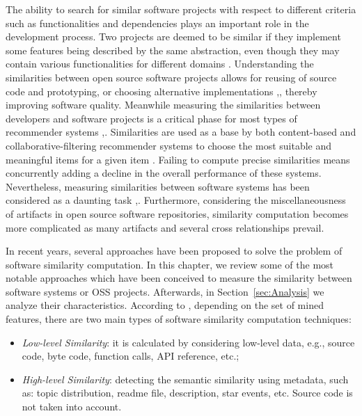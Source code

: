 The ability to search for similar software projects with respect to different criteria such as functionalities and dependencies plays an important role in the development process. Two projects are deemed to be similar if they implement some features being described by the same abstraction, even though they may contain various functionalities for different domains \cite{McMillan:2012:DSS:2337223.2337267}. Understanding the similarities between open source software projects allows for reusing of source code and prototyping, or choosing alternative implementations \cite{Schafer:2007:CFR:1768197.1768208},\cite{10.1109/SANER.2017.7884605}, thereby improving software quality. Meanwhile measuring the similarities between developers and software projects is a critical phase for most types of recommender systems \cite{DBLP:conf/rweb/NoiaO15},\cite{Sarwar:2001:ICF:371920.372071}. Similarities are used as a base by both content-based and collaborative-filtering recommender systems to choose the most suitable and meaningful items for a given item \cite{Schafer:2007:CFR:1768197.1768208}. Failing to compute precise similarities means concurrently adding a decline in the overall performance of these systems. Nevertheless, measuring similarities between software systems has been considered as a daunting task \cite{Chen:2015:SFD:2684822.2685305},\cite{McMillan:2012:DSS:2337223.2337267}. Furthermore, considering the miscellaneousness of artifacts in open source software repositories, similarity computation becomes more complicated as many artifacts and several cross relationships prevail. 

In recent years, several approaches have been proposed to solve the problem of software similarity computation. In this chapter, we review some of the most notable approaches which have been conceived to measure the similarity between software systems or OSS projects. Afterwards, in Section~\ref{sec:Analysis} we analyze their characteristics. According to \cite{Chen:2015:SFD:2684822.2685305}, depending on the set of mined features, there are two main types of software similarity computation techniques: 

\begin{itemize}	
	\item \textit{Low-level Similarity}: it is calculated by considering low-level data, e.g., source code, byte code, function calls, API reference, etc.; 
	\item \textit{High-level Similarity}: detecting the semantic similarity using metadata, such as: topic distribution, readme file, description, star events, etc. Source code is not taken into account.	
\end{itemize}

